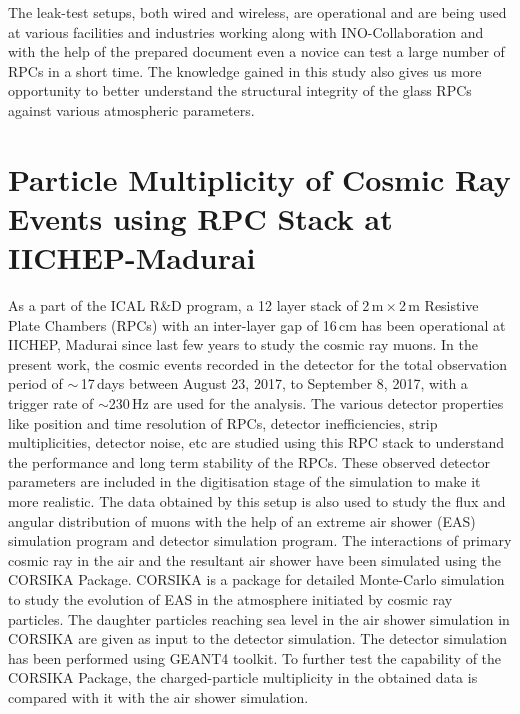 \documentclass[a4paper,12pt,twoside,openany]{article}
\begin{document}
The leak-test setups, both wired and wireless, are operational and are being used at various facilities and industries working along with INO-Collaboration and with the help of the prepared document even a novice can test a large number of RPCs in a short time. The knowledge gained in this study also gives us more opportunity to better understand the structural integrity of the glass RPCs against various atmospheric parameters.

\section{Particle Multiplicity of Cosmic Ray Events using RPC Stack at IICHEP-Madurai}

As a part of the ICAL R\&D program, a 12 layer stack of 2\,m\,$\times$\,2\,m Resistive Plate Chambers (RPCs) with an inter-layer gap of 16\,cm has been operational at IICHEP, Madurai since last few years to study the cosmic ray muons. In the present work, the cosmic events recorded in the detector for the total observation period of $\sim$\,17\,days between August 23, 2017, to September 8, 2017, with a trigger rate of $\sim$230\,Hz are used for the analysis. The various detector properties like position and time resolution of RPCs, detector inefficiencies, strip multiplicities, detector noise, etc are studied using this RPC stack to understand the performance and long term stability of the RPCs. These observed detector parameters are included in the digitisation stage of the simulation to make it more realistic.\cite{pethu1} The data obtained by this setup is also used to study the flux and angular distribution of muons with the help of an extreme air shower (EAS) simulation program and detector simulation program. The interactions of primary cosmic ray in the air and the resultant air shower have been simulated using the CORSIKA Package\cite{corsika763}. CORSIKA is a package for detailed Monte-Carlo simulation to study the evolution of EAS in the atmosphere initiated by cosmic ray particles. The daughter particles reaching sea level in the air shower simulation in CORSIKA are given as input to the detector simulation. The detector simulation has been performed using GEANT4 toolkit\cite{geant4}. To further test the capability of the CORSIKA Package, the charged-particle multiplicity in the obtained data is compared with it with the air shower simulation.
\end{document}
